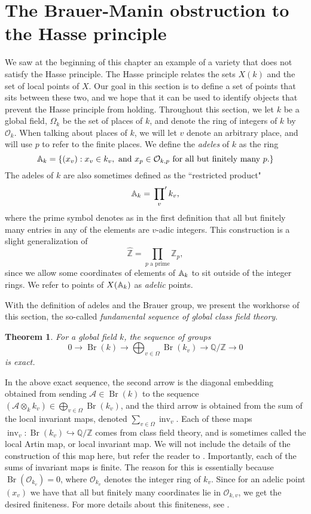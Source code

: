 \documentclass[12pt,twoside]{reedthesis}
\theoremstyle{plain}
\newtheorem{theorem}{Theorem}[chapter]
\theoremstyle{definition}
\theoremstyle{remark}
\newcommand{\ZZ}{\mathbb{Z}}
\newcommand{\Affine}{\mathbb{A}}
\newcommand{\QQ}{\mathbb{Q}}
\newcommand{\calA}{\mathcal{A}}
\newcommand{\calO}{\mathcal{O}}
\newcommand{\Br}{\operatorname{Br}}
\newcommand{\adele}{\reflectbox{$\Affine$}}
\newcommand{\inv}{\operatorname{inv}}
\begin{document}
\section{The Brauer-Manin obstruction to the Hasse principle}
We saw at the beginning of this chapter an example of a variety that does not satisfy the Hasse principle. The Hasse principle relates the sets $X(k)$ and the set of local points of $X$. Our goal in this section is to define a set of points that sits between these two, and we hope that it can be used to identify objects that prevent the Hasse principle from holding.
Throughout this section, we let $k$ be a global field, $\Omega_k$ be the set of places of $k$, and denote the ring of integers of $k$ by $\calO_k$. When talking about places of $k$, we will let $v$ denote an arbitrary place, and will use $p$ to refer to the finite places. We define the \emph{adeles} of $k$ as the ring
\[
\adele_k=\{(x_v):x_v\in k_v,\text{ and } x_p\in\calO_{k,p}\text{ for all but finitely many $p$.}\}
\]
The adeles of $k$ are also sometimes defined as the ``restricted product"
\[
\adele_k=\sideset{}{^\prime}\prod_v k_v,
\]
where the prime symbol denotes as in the first definition that all but finitely many entries in any of the elements are $v$-adic integers. This construction is a slight generalization of 
\[
\hat{\ZZ}=\prod_{p\text{ a prime}}\ZZ_p,
\] 
since we allow some coordinates of elements of $\adele_k$ to sit outside of the integer rings. We refer to points of $X(\adele_k)$ as \emph{adelic} points.

With the definition of adeles and the Brauer group, we present the workhorse of this section, the so-called \emph{fundamental sequence of global class field theory}.
\begin{theorem} For a global field $k$, the sequence of groups
\[
0\longrightarrow \Br(k)\longrightarrow \bigoplus_{v\in\Omega}\Br(k_v)\longrightarrow \QQ/\ZZ\longrightarrow0
\]
is exact.\label{sequence}
\end{theorem}
\noindent In the above exact sequence, the second arrow is the diagonal embedding obtained from sending $\calA\in\Br(k)$ to the sequence $(\calA\otimes_k k_v)\in\bigoplus_{v\in\Omega}\Br(k_v)$, and the third arrow is obtained from the sum of the local invariant maps, denoted $\sum_{v\in\Omega} \inv_v$.   Each of these maps $\inv_v:\Br(k_v)\hookrightarrow\QQ/\ZZ$ comes from class field theory, and is sometimes called the local Artin map, or local invariant map. We will not include the details of the construction of this map here, but refer the reader to \cite{milneCFT}. Importantly, each of the sums of invariant maps is finite. The reason for this is essentially because $\Br(\calO_{k_v})=0$, where $\calO_{k_v}$ denotes the integer ring of $k_v$. Since for an adelic point $(x_v)$ we have that all but finitely many coordinates lie in $\calO_{k,v}$, we get the desired finiteness. For more details about this finiteness, see \cite[Section 5.5.2]{skoQpoints}.
\end{document}
